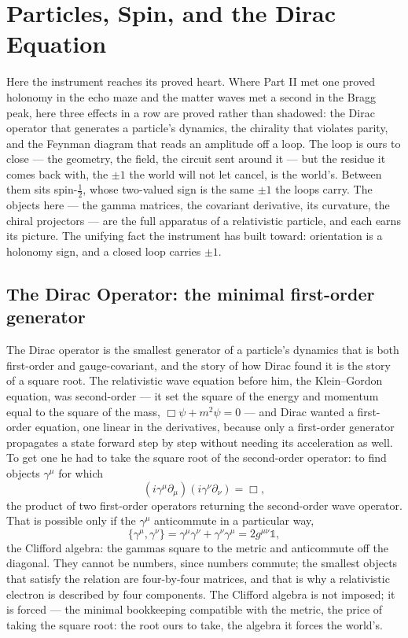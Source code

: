 \chapter{Particles, Spin, and the Dirac Equation}
\label{chap:particles-spin-dirac}

Here the instrument reaches its proved heart. Where Part II met one proved holonomy in the echo maze and the
matter waves met a second in the Bragg peak, here three effects in a row are proved rather than shadowed: the
Dirac operator that generates a particle's dynamics, the chirality that violates parity, and the Feynman
diagram that reads an amplitude off a loop. The loop is ours to close --- the geometry, the field, the circuit
sent around it --- but the residue it comes back with, the $\pm 1$ the world will not let cancel, is the
world's. Between them sits spin-$\tfrac12$, whose two-valued sign is the same $\pm 1$ the loops carry. The
objects here --- the gamma matrices, the covariant derivative, its curvature, the chiral projectors --- are the
full apparatus of a relativistic particle, and each earns its picture. The unifying fact the instrument has
built toward: orientation is a holonomy sign, and a closed loop carries $\pm 1$.

\section{The Dirac Operator: the minimal first-order generator}
\label{se:dirac}

The Dirac operator is the smallest generator of a particle's dynamics that is both first-order and
gauge-covariant, and the story of how Dirac found it is the story of a square root. The relativistic wave
equation before him, the Klein--Gordon equation, was second-order --- it set the square of the energy and
momentum equal to the square of the mass, $\Box\psi + m^2\psi = 0$ --- and Dirac wanted a first-order
equation, one linear in the derivatives, because only a first-order generator propagates a state forward step
by step without needing its acceleration as well. To get one he had to take the square root of the
second-order operator: to find objects $\gamma^\mu$ for which
\begin{equation}
  (i\gamma^\mu \partial_\mu)(i\gamma^\nu \partial_\nu) = \Box,
\end{equation}
the product of two first-order operators returning the second-order wave operator. That is possible only if
the $\gamma^\mu$ anticommute in a particular way,
\begin{equation}
  \{\gamma^\mu, \gamma^\nu\} = \gamma^\mu\gamma^\nu + \gamma^\nu\gamma^\mu = 2g^{\mu\nu}\mathbb{1},
\end{equation}
the Clifford algebra: the gammas square to the metric and anticommute off the diagonal. They cannot be
numbers, since numbers commute; the smallest objects that satisfy the relation are four-by-four matrices, and
that is why a relativistic electron is described by four components. The Clifford algebra is not imposed; it is
forced --- the minimal bookkeeping compatible with the metric, the price of taking the square root: the root
ours to take, the algebra it forces the world's.

